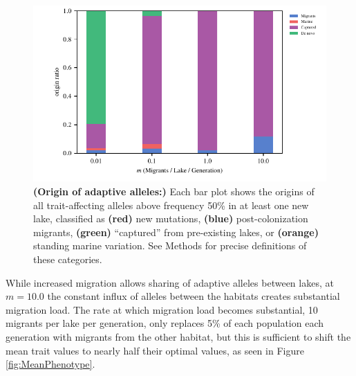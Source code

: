 \documentclass{article}
\newcommand{\plr}[1]{\todo[linecolor=blue,backgroundcolor=blue!25,bordercolor=blue]{#1}}
\begin{document}
\begin{figure}
    \begin{center}
    \includegraphics[width=0.7\linewidth]{Final_Plots/Allele_Origin_2.pdf}
    \caption{ 
        \textbf{(Origin of adaptive alleles:)}
        Each bar plot shows the origins
        of all trait-affecting alleles above frequency 50\% in at least one new lake,
        classified as
        \textbf{(red)} new mutations,
        \textbf{(blue)} post-colonization migrants,
        \textbf{(green)} ``captured'' from pre-existing lakes, or
        \textbf{(orange)} standing marine variation.
        See Methods for precise definitions of these categories.
    } \label{fig:Origin}
    \end{center}
\end{figure}

While increased migration allows sharing of adaptive alleles between lakes, 
at $m = 10.0$ the constant influx of alleles between the habitats creates substantial migration load. 
The rate at which migration load becomes substantial,
10 migrants per lake per generation,
only replaces 5\% of each population each generation with migrants from the other habitat, 
but this is sufficient to shift the mean trait values to nearly half their optimal values, 
as seen in Figure \ref{fig:MeanPhenotype}. 

\end{document}
